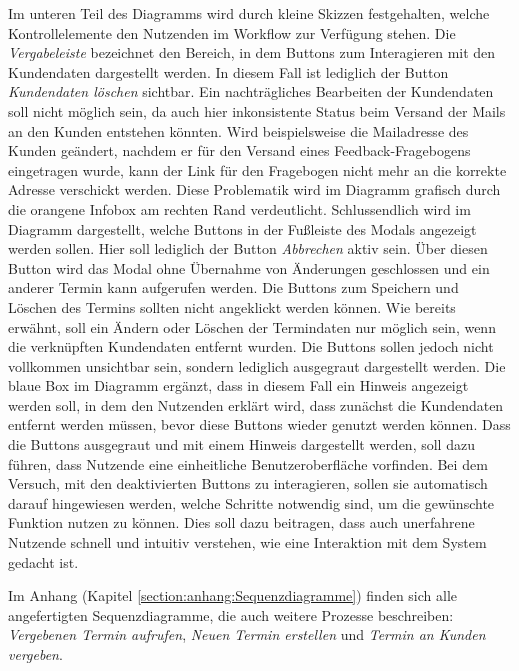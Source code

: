 Im unteren Teil des Diagramms wird durch kleine Skizzen festgehalten, welche
Kontrollelemente den Nutzenden im Workflow zur Verfügung stehen. Die
\textit{Vergabeleiste} bezeichnet den Bereich, in dem Buttons zum Interagieren
mit den Kundendaten dargestellt werden. In diesem Fall ist lediglich der Button
\textit{Kundendaten löschen} sichtbar. Ein nachträgliches Bearbeiten der
Kundendaten soll nicht möglich sein, da auch hier inkonsistente Status beim
Versand der Mails an den Kunden entstehen könnten. Wird beispielsweise die
Mailadresse des Kunden geändert, nachdem er für den Versand eines
Feedback-Fragebogens eingetragen wurde, kann der Link für den Fragebogen nicht
mehr an die korrekte Adresse verschickt werden. Diese Problematik wird im
Diagramm grafisch durch die orangene Infobox am rechten Rand verdeutlicht.
Schlussendlich wird im Diagramm dargestellt, welche Buttons in der Fußleiste
des Modals angezeigt werden sollen. Hier soll lediglich der Button
\textit{Abbrechen} aktiv sein. Über diesen Button wird das Modal ohne Übernahme
von Änderungen geschlossen und ein anderer Termin kann aufgerufen werden. Die
Buttons zum Speichern und Löschen des Termins sollten nicht angeklickt werden
können. Wie bereits erwähnt, soll ein Ändern oder Löschen der Termindaten nur
möglich sein, wenn die verknüpften Kundendaten entfernt wurden. Die Buttons
sollen jedoch nicht vollkommen unsichtbar sein, sondern lediglich ausgegraut
dargestellt werden. Die blaue Box im Diagramm ergänzt, dass in diesem Fall ein
Hinweis angezeigt werden soll, in dem den Nutzenden erklärt wird, dass zunächst
die Kundendaten entfernt werden müssen, bevor diese Buttons wieder genutzt
werden können. Dass die Buttons ausgegraut und mit einem Hinweis dargestellt
werden, soll dazu führen, dass Nutzende eine einheitliche Benutzeroberfläche
vorfinden. Bei dem Versuch, mit den deaktivierten Buttons zu interagieren,
sollen sie automatisch darauf hingewiesen werden, welche Schritte notwendig
sind, um die gewünschte Funktion nutzen zu können. Dies soll dazu beitragen,
dass auch unerfahrene Nutzende schnell und intuitiv verstehen, wie eine
Interaktion mit dem System gedacht ist.

Im Anhang (Kapitel \ref{section:anhang:Sequenzdiagramme}) finden sich alle angefertigten Sequenzdiagramme, die auch weitere Prozesse beschreiben: \textit{Vergebenen
    Termin aufrufen}, \textit{Neuen Termin erstellen} und \textit{Termin an Kunden
    vergeben}.

